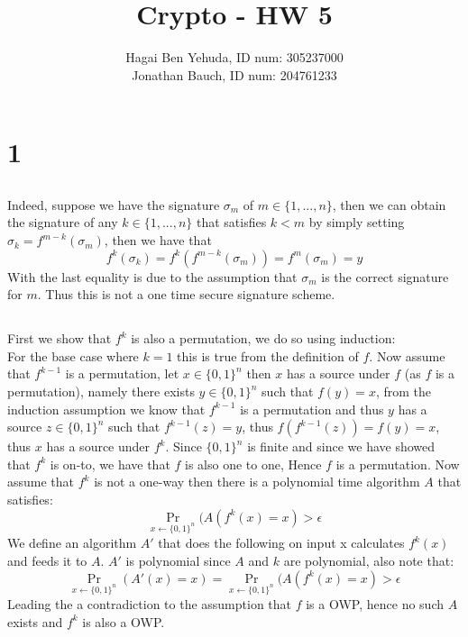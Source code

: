 \documentclass{article}
\title{Crypto - HW 5}
\author{Hagai Ben Yehuda, ID num: 305237000\\ Jonathan Bauch, ID num: 204761233}
\date{}
\begin{document}
  \maketitle

\section{1}
\subsection{}%
Indeed, suppose we have the signature $\sigma_m$ of $m\in\{1,..., n\}$, then we can obtain the signature of any $k \in\{1,...,n\}$ that satisfies $k < m$ by simply setting $\sigma_k = f^{m-k}(\sigma_m)$, then we have that 
\[f^{k}(\sigma_k) = f^{k}(f^{m-k}(\sigma_m)) = f^{m}(\sigma_m) = y\]
With the last equality is due to the assumption that $\sigma_m$ is the correct signature for $m$.
Thus this is not a one time secure signature scheme.

\subsection{}%
First we show that $f^k$ is also a permutation, we do so using induction:\\
For the base case where $k = 1$ this is true from the definition of $f$.
Now assume that $f^{k-1}$ is a permutation, let $x\in\{0,1\}^n$ then $x$ has a source under $f$ (as $f$ is a permutation), namely there exists $y\in\{0,1\}^n$ such that $f(y) = x$, from the induction assumption we know that $f^{k-1}$ is a permutation and thus $y$ has a source $z\in\{0,1\}^n$ such that $f^{k-1}(z) = y$, thus $f(f^{k-1}(z)) = f(y) = x$, thus $x$ has a source under $f^k$.
Since $\{0,1\}^n$ is finite and since we have showed that $f^k$ is on-to, we have that $f$ is also one to one, Hence $f$ is a permutation.
Now assume that $f^k$ is not a one-way then there is a polynomial time algorithm $A$ that satisfies: 
\[\Pr_{x\leftarrow \{0,1\}^n}(A(f^k(x) = x) > \epsilon\]
We define an algorithm $A'$ that does the following on input x calculates $f^k(x)$ and feeds it to $A$. $A'$ is polynomial since $A$ and $k$ are polynomial, also note that:
\[\Pr_{x\leftarrow \{0,1\}^n}(A'(x) = x) = \Pr_{x\leftarrow \{0,1\}^n}(A(f^k(x) = x) > \epsilon\]
Leading the a contradiction to the assumption that $f$ is a OWP, hence no such $A$ exists and $f^k$ is also a OWP.
\end{document}
